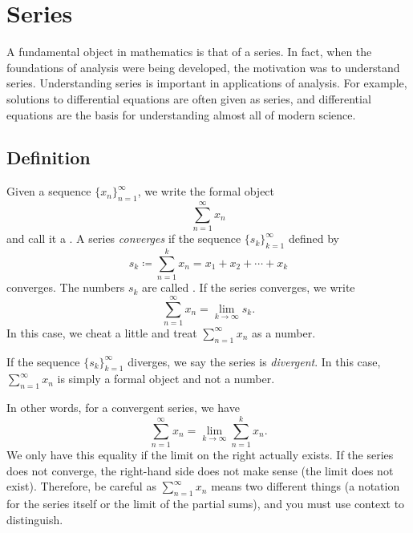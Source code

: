 
\sectionnewpage
\section{Series}
\label{sec:series}



A fundamental object in mathematics is that of a series.  In fact, when
the foundations of analysis were being developed, the motivation was to
understand series.  Understanding series is important in applications
of analysis.  For example, solutions to differential equations are often
given as series, and differential equations are the basis for understanding
almost all of modern science.

\subsection{Definition}

\begin{defn}
Given a sequence $\{ x_n \}_{n=1}^\infty$, we write the formal object
\begin{equation*}
\sum_{n=1}^\infty x_n
\end{equation*}
and call it a \emph{}.  A series
\emph{converges} if the sequence
$\{ s_k \}_{k=1}^\infty$
defined by
\begin{equation*}
s_k \coloneqq \sum_{n=1}^k x_n = x_1 + x_2 + \cdots + x_k
\end{equation*}
converges.
The numbers $s_k$ are called
\emph{}.
If the series converges, we write
\begin{equation*}
\sum_{n=1}^\infty x_n =  \lim\limits_{k\to\infty} s_k .
\end{equation*}
In this case, we cheat a little and treat
$\sum_{n=1}^\infty x_n$ as a number.

If the sequence $\{ s_k \}_{k=1}^\infty$ diverges,
we say the series is \emph{divergent}.
In this case, $\sum_{n=1}^\infty x_n$ is simply a formal object and not a number.
\end{defn}

In other words, for a convergent series, we have
\begin{equation*}
\sum_{n=1}^\infty x_n
=
\lim_{k\to\infty} 
\sum_{n=1}^k x_n .
\end{equation*}
We only have this equality if the limit on
the right actually exists.  If the series does not converge, the right-hand
side does not make sense (the limit does not exist).
Therefore, be careful as 
$\sum_{n=1}^\infty x_n$ means two different things (a notation for the series itself 
or the limit of the partial sums), and you must use context
to distinguish.

